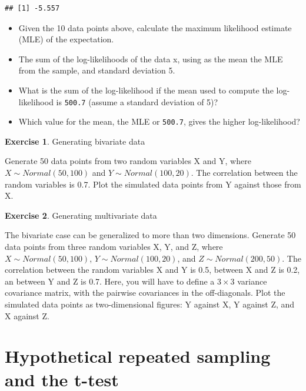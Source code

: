 \documentclass[
  12pt,
]{krantz}
\providecommand{\tightlist}{%
  \setlength{\itemsep}{0pt}\setlength{\parskip}{0pt}}
\theoremstyle{definition}
\theoremstyle{definition}
\theoremstyle{definition}
\newtheorem{exercise}{Exercise}[chapter]
\theoremstyle{definition}
\theoremstyle{remark}
\begin{document}
\begin{verbatim}
## [1] -5.557
\end{verbatim}

\begin{itemize}
\tightlist
\item
  Given the 10 data points above, calculate the maximum likelihood estimate (MLE) of the expectation.
\item
  The sum of the log-likelihoods of the data x, using as the mean the MLE from the sample, and standard deviation 5.
\item
  What is the sum of the log-likelihood if the mean used to compute the log-likelihood is \texttt{500.7} (assume a standard deviation of 5)?
\item
  Which value for the mean, the MLE or \texttt{500.7}, gives the higher log-likelihood?
\end{itemize}

\begin{exercise}
\protect\hypertarget{exr:Foundationsexercisesbivariate}{}\label{exr:Foundationsexercisesbivariate}Generating bivariate data
\end{exercise}

Generate 50 data points from two random variables X and Y, where \(X\sim Normal(50,100)\) and \(Y\sim Normal(100,20)\). The correlation between the random variables is 0.7. Plot the simulated data points from Y against those from X.

\begin{exercise}
\protect\hypertarget{exr:Foundationsexercisesmultivariate}{}\label{exr:Foundationsexercisesmultivariate}Generating multivariate data
\end{exercise}

The bivariate case can be generalized to more than two dimensions.
Generate 50 data points from three random variables X, Y, and Z, where \(X\sim Normal(50,100)\), \(Y\sim Normal(100,20)\), and \(Z\sim Normal(200,50)\). The correlation between the random variables X and Y is 0.5, between X and Z is 0.2, an between Y and Z is 0.7. Here, you will have to define a \(3\times 3\) variance covariance matrix, with the pairwise covariances in the off-diagonals. Plot the simulated data points as two-dimensional figures: Y against X, Y against Z, and X against Z.

\hypertarget{hypothetical-repeated-sampling-and-the-t-test}{%
\chapter{Hypothetical repeated sampling and the t-test}\label{hypothetical-repeated-sampling-and-the-t-test}}
\end{document}
